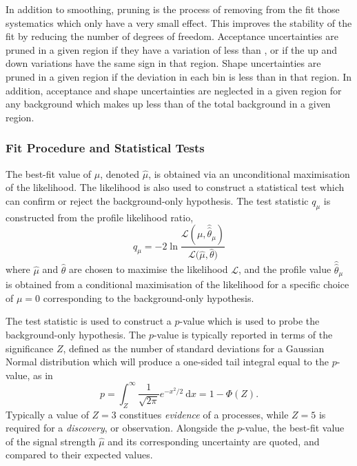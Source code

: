In addition to smoothing, pruning is the process of removing from the fit those systematics which only have a very small effect.
This improves the stability of the fit by reducing the number of degrees of freedom.
Acceptance uncertainties are pruned in a given region if they have a variation of less than , or if the up and down variations have the same sign in that region.
Shape uncertainties are pruned in a given region if the deviation in each bin is less than  in that region.
In addition, acceptance and shape uncertainties are neglected in a given region for any background which makes up less than  of the total background in a given region.


\subsubsection{Fit Procedure and Statistical Tests}

The best-fit value of $\mu$, denoted $\hat\mu$, is obtained via an unconditional maximisation of the likelihood.
The likelihood is also used to construct a statistical test which can confirm or reject the background-only hypothesis.
The test statistic $q_\mu$ is constructed from the profile likelihood ratio,
%
\begin{equation}
  q_\mu = -2 \ln \frac{\mathcal{L(\mu, \hat{\hat{\theta}}_\mu )} } { \mathcal{L(\hat{\mu}, \hat{\theta}}) }
\end{equation}
%
where $\hat{\mu}$ and $\hat{\theta}$ are chosen to maximise the likelihood $\mathcal{L}$, and the profile value $\hat{\hat{\theta}}_\mu$ is obtained from a conditional maximisation of the likelihood for a specific choice of $\mu = 0$ corresponding to the background-only hypothesis.

The test statistic is used to construct a $p$-value which is used to probe the background-only hypothesis.
The $p$-value is typically reported in terms of the significance $Z$, defined as the number of standard deviations for a Gaussian Normal distribution which will produce a one-sided tail integral equal to the $p$-value, as in
%
\begin{equation}
  p = \int_Z^{\infty} \frac{1}{\sqrt{2 \pi}} e^{-x^2/2} ~\mathrm{d} x
  = 1 - \Phi(Z) .
\end{equation}
%
Typically a value of $Z=3$ constitues \textit{evidence} of a processes, while $Z=5$ is required for a \textit{discovery}, or observation.
Alongside the $p$-value, the best-fit value of the signal strength $\hat\mu$ and its corresponding uncertainty are quoted, and compared to their expected values.


